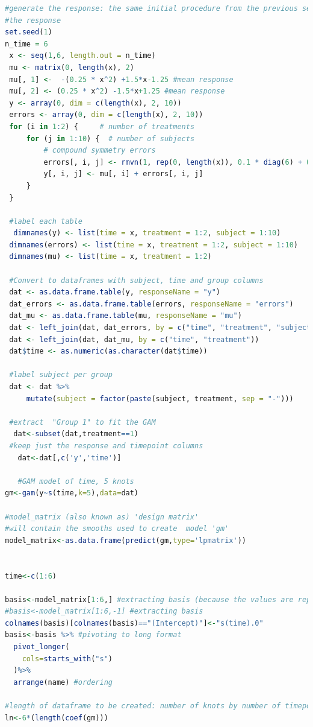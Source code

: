 \documentclass[
]{article}
\begin{document}
\begin{lstlisting}[language=R]
#generate the response: the same initial procedure from the previous section to simulate
#the response
set.seed(1)
n_time = 6
 x <- seq(1,6, length.out = n_time)
 mu <- matrix(0, length(x), 2)
 mu[, 1] <-  -(0.25 * x^2) +1.5*x-1.25 #mean response
 mu[, 2] <- (0.25 * x^2) -1.5*x+1.25 #mean response
 y <- array(0, dim = c(length(x), 2, 10))
 errors <- array(0, dim = c(length(x), 2, 10))
 for (i in 1:2) {     # number of treatments
     for (j in 1:10) {  # number of subjects
         # compound symmetry errors
         errors[, i, j] <- rmvn(1, rep(0, length(x)), 0.1 * diag(6) + 0.25 * matrix(1, 6, 6))
         y[, i, j] <- mu[, i] + errors[, i, j]
     }
 }
 
 #label each table
  dimnames(y) <- list(time = x, treatment = 1:2, subject = 1:10)
 dimnames(errors) <- list(time = x, treatment = 1:2, subject = 1:10)
 dimnames(mu) <- list(time = x, treatment = 1:2)
 
 #Convert to dataframes with subject, time and group columns
 dat <- as.data.frame.table(y, responseName = "y")
 dat_errors <- as.data.frame.table(errors, responseName = "errors")
 dat_mu <- as.data.frame.table(mu, responseName = "mu")
 dat <- left_join(dat, dat_errors, by = c("time", "treatment", "subject"))
 dat <- left_join(dat, dat_mu, by = c("time", "treatment"))
 dat$time <- as.numeric(as.character(dat$time))
 
 #label subject per group
 dat <- dat %>%
     mutate(subject = factor(paste(subject, treatment, sep = "-")))
  
 #extract  "Group 1" to fit the GAM
  dat<-subset(dat,treatment==1)
 #keep just the response and timepoint columns
   dat<-dat[,c('y','time')]

   #GAM model of time, 5 knots
gm<-gam(y~s(time,k=5),data=dat)

#model_matrix (also known as) 'design matrix'
#will contain the smooths used to create  model 'gm'
model_matrix<-as.data.frame(predict(gm,type='lpmatrix'))


time<-c(1:6)

basis<-model_matrix[1:6,] #extracting basis (because the values are repeated after every 6 rows)
#basis<-model_matrix[1:6,-1] #extracting basis
colnames(basis)[colnames(basis)=="(Intercept)"]<-"s(time).0"
basis<-basis %>% #pivoting to long format
  pivot_longer(
    cols=starts_with("s")
  )%>%
  arrange(name) #ordering

#length of dataframe to be created: number of knots by number of timepoints (minus 1 for the intercept that we won't plot)
ln<-6*(length(coef(gm))) 


\end{lstlisting}
\end{document}
